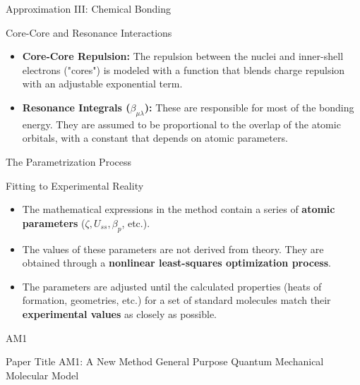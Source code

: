 \begin{frame}{Approximation III: Chemical Bonding}
    \begin{block}{Core-Core and Resonance Interactions}
        \begin{itemize}
            \item \textbf{Core-Core Repulsion:} The repulsion between the nuclei and inner-shell electrons ("cores") is modeled with a function that blends charge repulsion with an adjustable exponential term.
            \pause
            \bigskip
            \item \textbf{Resonance Integrals ($\beta_{\mu\lambda}$):} These are responsible for most of the bonding energy. They are assumed to be proportional to the overlap of the atomic orbitals, with a constant that depends on atomic parameters.
        \end{itemize}
    \end{block}
\end{frame}


\begin{frame}{The Parametrization Process}
    \begin{block}{Fitting to Experimental Reality}
        \begin{itemize}
            \item The mathematical expressions in the method contain a series of \textbf{atomic parameters} ($\zeta, U_{ss}, \beta_p$, etc.).
            \pause
            \bigskip
            \item The values of these parameters are not derived from theory. They are obtained through a \textbf{nonlinear least-squares optimization process}.
            \pause
            \bigskip
            \item The parameters are adjusted until the calculated properties (heats of formation, geometries, etc.) for a set of standard molecules match their \textbf{experimental values} as closely as possible.
        \end{itemize}
    \end{block}
\end{frame}


\begin{frame}{AM1}
	\begin{block}{Paper Title}
	AM1: A New Method General Purpose Quantum Mechanical Molecular Model
	\end{block}
\end{frame}


